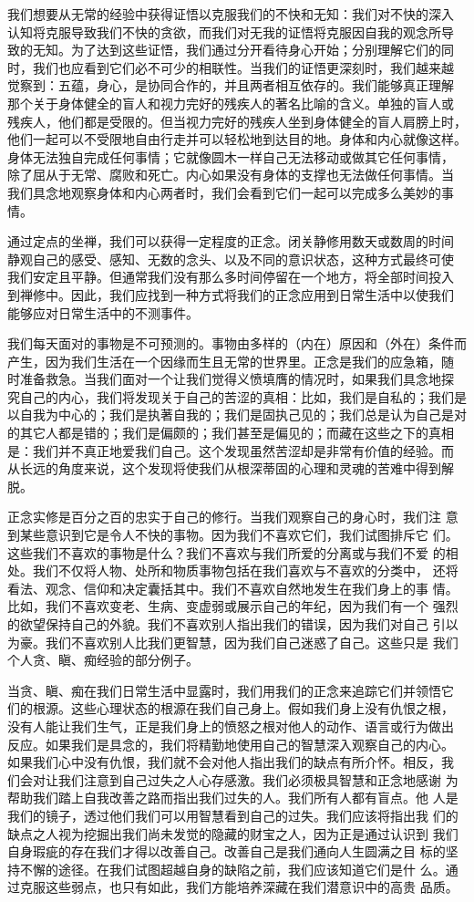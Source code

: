 我们想要从无常的经验中获得证悟以克服我们的不快和无知：我们对不快的深入
认知将克服导致我们不快的贪欲，而我们对无我的证悟将克服因自我的观念所导
致的无知。为了达到这些证悟，我们通过分开看待身心开始；分别理解它们的同
时，我们也应看到它们必不可少的相联性。当我们的证悟更深刻时，我们越来越
觉察到：五蕴，身心，是协同合作的，并且\1两者相互依存的。我们能够真正理解
那个关于身体健全的盲人和视力完好的残疾人的著名比喻的含义。单独的盲人或
残疾人，他们都是受限的。但当视力完好的残疾人坐到身体健全的盲人肩膀上时，
他们一起可以不受限地自由行走并可以轻松地到达目的地。身体和内心就像这样。
身体无法独自完成任何事情；它就像圆木一样自己无法移动或做其它任何事情，
除了屈从于无常、腐败和死亡。内心如果没有身体的支撑也无法做任何事情。当
我们具念地观察身体和内心两者时，我们会看到它们一起可以完成多么美妙的事
情。

通过定点的坐禅，我们可以获得一定程度的正念。闭关静修用数天或数周的时间
静观自己的感受、感知、无数的念头、以及不同的意识状态，这种方式最终可使
我们安定且平静。但通常我们没有那么多时间停留在一个地方，将全部时间投入
到禅修中。因此，我们应找到一种方式将我们的正念应用到日常生活中以使我们
能够应对日常生活中的不测事件。

我们每天面对的事物是不可预测的。事物由多样的（内在）原因和（外在）条件而
产生，因为我们生活在一个因缘而生且无常的世界里。正念是我们的应急箱，随
时准备救急。当我们面对一个让我们觉得义愤填膺的情况时，如果我们具念地探
究自己的内心，我们将发现关于自己的苦涩的真相：比如，我们是自私的；我们是
以自我为中心的；我们是执著自我的；我们是固执己见的；我们总是认为自己是对
的其它人都是错的；我们是偏颇的；我们甚至是偏见的；而藏在这些之下的真相
是：我们并不真正地爱我们自己。这个发现虽然苦涩却是非常有价值的经验。而
从长远的角度来说，这个发现将使我们从根深蒂固的心理和灵魂的苦难中得到解
脱。

\1正念实修是百分之百的忠实于自己的修行。当我们观察自己的身心时，我们注
意到某些意识到它是令人不快的事物。因为我们不喜欢它们，我们试图排斥它
们。这些我们不喜欢的事物是什么？我们不喜欢与我们所爱的分离或与我们不爱
的相处。我们不仅将人物、处所和物质事物包括在我们喜欢与不喜欢的分类中，
还将看法、观念、信仰和决定囊括其中。我们不喜欢自然地发生在我们身上的事
情。比如，我们不喜欢变老、生病、变虚弱或展示自己的年纪，因为我们有一个
强烈的欲望保持自己的外貌。我们不喜欢别人指出我们的错误，因为我们对自己
引以为豪。我们不喜欢别人比我们更智慧，因为我们自己迷惑了自己。这些只是
我们个人贪、瞋、痴经验的部分例子。

当贪、瞋、痴在我们日常生活中显露时，我们用我们的正念来追踪它们并领悟它
们的根源。这些心理状态的根源在我们自己身上。假如我们身上没有仇恨之根，
没有人能让我们生气，正是我们身上的愤怒之根对他人的动作、语言或行为做出
反应。如果我们是具念的，我们将精勤地使用自己的智慧深入观察自己的内心。
如果我们心中没有仇恨，我们就不会对他人指出我们的缺点有所介怀。相反，我
们会对让我们注意到自己过失之人心存感激。我们必须极具智慧和正念地感谢
为帮助我们踏上自我改善之路而指出我们过失的人。我们所有人都有盲点。他
人是我们的镜子，透过他们我们可以用智慧看到自己的过失。我们应该将指出我
们的缺点之人视为挖掘出我们尚未发觉的隐藏的财宝之人，因为正是通过认识到
我们自身瑕疵的存在我们才得以改善自己。改善自己是我们\1通向人生圆满之目
标的坚持不懈的途径。在我们试图超越自身的缺陷之前，我们应该知道它们是什
么。通过克服这些弱点，也只有如此，我们方能培养深藏在我们潜意识中的高贵
品质。


